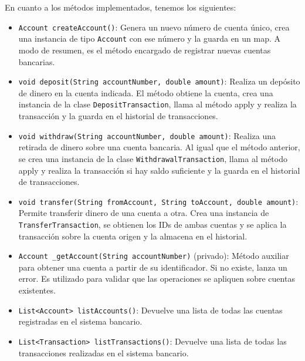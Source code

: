 \documentclass[12pt]{article}
\begin{document}
En cuanto a los métodos implementados, tenemos los siguientes:
\begin{itemize}
    \item \texttt{Account createAccount()}: Genera un nuevo número de cuenta único, crea una instancia de tipo \texttt{Account} con ese número y la guarda en un map. A modo de resumen, es el método encargado de registrar nuevas cuentas bancarias.

    \item \texttt{void deposit(String accountNumber, double amount)}: Realiza un depósito de dinero en la cuenta indicada. El método obtiene la cuenta, crea una instancia de la clase \texttt{DepositTransaction}, llama al método apply y realiza la transacción y la guarda en el historial de transacciones.

    \item \texttt{void withdraw(String accountNumber, double amount)}: Realiza una retirada de dinero sobre una cuenta bancaria. Al igual que el método anterior, se crea una instancia de la clase \texttt{WithdrawalTransaction}, llama al método apply y realiza la transacción si hay saldo suficiente y la guarda en el historial de transacciones.

    \item \texttt{void transfer(String fromAccount, String toAccount, double amount)}: Permite transferir dinero de una cuenta a otra. Crea una instancia de \texttt{TransferTransaction}, se obtienen los IDs de ambas cuentas y se aplica la transacción sobre la cuenta origen y la almacena en el historial.

    \item \texttt{Account \_getAccount(String accountNumber)} (privado): Método auxiliar para obtener una cuenta a partir de su identificador. Si no existe, lanza un error. Es utilizado para validar que las operaciones se apliquen sobre cuentas existentes.

    \item \texttt{List<Account> listAccounts()}: Devuelve una lista de todas las cuentas registradas en el sistema bancario.

    \item \texttt{List<Transaction> listTransactions()}: Devuelve una lista de todas las transacciones realizadas en el sistema bancario.
\end{itemize}
\end{document}
